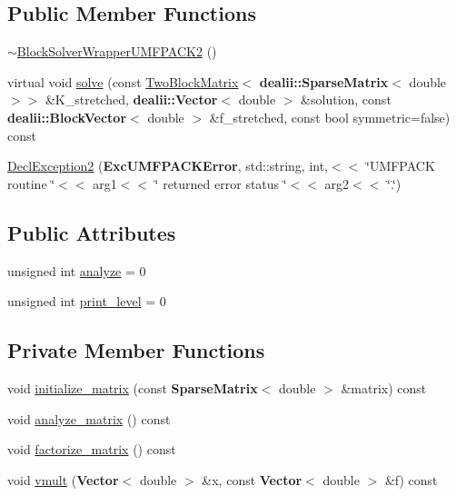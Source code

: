\subsection*{Public Member Functions}
\begin{DoxyCompactItemize}
\item 
\hyperlink{class_block_solver_wrapper_u_m_f_p_a_c_k2_a8f298590602e05af072f1ce4178199f2}{$\sim$\+Block\+Solver\+Wrapper\+U\+M\+F\+P\+A\+C\+K2} ()
\item 
virtual void \hyperlink{class_block_solver_wrapper_u_m_f_p_a_c_k2_a490b0cf1b929be32d3a4e26a97a520ec}{solve} (const \hyperlink{class_two_block_matrix}{Two\+Block\+Matrix}$<$ {\bf dealii\+::\+Sparse\+Matrix}$<$ double $>$$>$ \&K\+\_\+stretched, {\bf dealii\+::\+Vector}$<$ double $>$ \&solution, const {\bf dealii\+::\+Block\+Vector}$<$ double $>$ \&f\+\_\+stretched, const bool symmetric=false) const 
\item 
\hyperlink{class_block_solver_wrapper_u_m_f_p_a_c_k2_aa454139937c8f01d8e893a7e09d3b1a2}{Decl\+Exception2} ({\bf Exc\+U\+M\+F\+P\+A\+C\+K\+Error}, std\+::string, int,$<$$<$ \char`\"{}U\+M\+F\+P\+A\+CK routine \char`\"{}$<$$<$ arg1$<$$<$ \char`\"{} returned error status \char`\"{}$<$$<$ arg2$<$$<$ \char`\"{}.\char`\"{})
\end{DoxyCompactItemize}
\subsection*{Public Attributes}
\begin{DoxyCompactItemize}
\item 
unsigned int \hyperlink{class_block_solver_wrapper_u_m_f_p_a_c_k2_a5869a4301c4e7a3ae64aa8998131d8c7}{analyze} = 0
\item 
unsigned int \hyperlink{class_block_solver_wrapper_u_m_f_p_a_c_k2_af78261735f66012f531c3a71c9640d2c}{print\+\_\+level} = 0
\end{DoxyCompactItemize}
\subsection*{Private Member Functions}
\begin{DoxyCompactItemize}
\item 
void \hyperlink{class_block_solver_wrapper_u_m_f_p_a_c_k2_ab97e246439c72620e7c434fd53ac96e9}{initialize\+\_\+matrix} (const {\bf Sparse\+Matrix}$<$ double $>$ \&matrix) const 
\item 
void \hyperlink{class_block_solver_wrapper_u_m_f_p_a_c_k2_a81e44a6e9414b3ef84295f966a16a907}{analyze\+\_\+matrix} () const 
\item 
void \hyperlink{class_block_solver_wrapper_u_m_f_p_a_c_k2_a257c886568befa97173650ebd6d09344}{factorize\+\_\+matrix} () const 
\item 
void \hyperlink{class_block_solver_wrapper_u_m_f_p_a_c_k2_a359ffe48728b7ed55500b959fea67d59}{vmult} ({\bf Vector}$<$ double $>$ \&x, const {\bf Vector}$<$ double $>$ \&f) const 
\end{DoxyCompactItemize}
